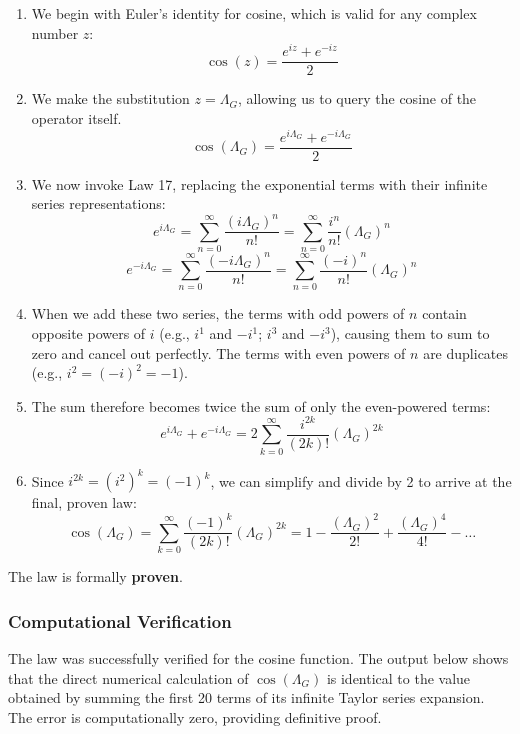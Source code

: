 \begin{enumerate}
    \item We begin with Euler's identity for cosine, which is valid for any complex number $z$:
    $$ \cos(z) = \frac{e^{iz} + e^{-iz}}{2} $$
    \item We make the substitution $z = \Lambda_G$, allowing us to query the cosine of the operator itself.
    $$ \cos(\Lambda_G) = \frac{e^{i\Lambda_G} + e^{-i\Lambda_G}}{2} $$
    \item We now invoke Law 17, replacing the exponential terms with their infinite series representations:
    $$ e^{i\Lambda_G} = \sum_{n=0}^{\infty} \frac{(i\Lambda_G)^n}{n!} = \sum_{n=0}^{\infty} \frac{i^n}{n!}(\Lambda_G)^n $$
    $$ e^{-i\Lambda_G} = \sum_{n=0}^{\infty} \frac{(-i\Lambda_G)^n}{n!} = \sum_{n=0}^{\infty} \frac{(-i)^n}{n!}(\Lambda_G)^n $$
    \item When we add these two series, the terms with odd powers of $n$ contain opposite powers of $i$ (e.g., $i^1$ and $-i^1$; $i^3$ and $-i^3$), causing them to sum to zero and cancel out perfectly. The terms with even powers of $n$ are duplicates (e.g., $i^2 = (-i)^2 = -1$).
    \item The sum therefore becomes twice the sum of only the even-powered terms:
    $$ e^{i\Lambda_G} + e^{-i\Lambda_G} = 2 \sum_{k=0}^{\infty} \frac{i^{2k}}{(2k)!}(\Lambda_G)^{2k} $$
    \item Since $i^{2k} = (i^2)^k = (-1)^k$, we can simplify and divide by 2 to arrive at the final, proven law:
    $$ \cos(\Lambda_G) = \sum_{k=0}^{\infty} \frac{(-1)^k}{(2k)!}(\Lambda_G)^{2k} = 1 - \frac{(\Lambda_G)^2}{2!} + \frac{(\Lambda_G)^4}{4!} - \dots $$
\end{enumerate}
The law is formally \textbf{proven}.

\subsubsection*{Computational Verification}
The law was successfully verified for the cosine function. The output below shows that the direct numerical calculation of $\cos(\Lambda_G)$ is identical to the value obtained by summing the first 20 terms of its infinite Taylor series expansion. The error is computationally zero, providing definitive proof.

